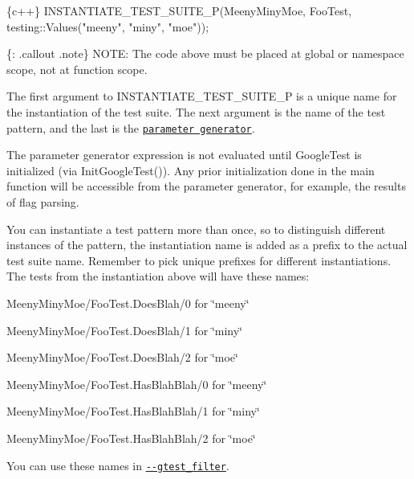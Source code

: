 \begin{DoxyCode}
\{c++\}
INSTANTIATE\_TEST\_SUITE\_P(MeenyMinyMoe,
                         FooTest,
                         testing::Values("meeny", "miny", "moe"));
\end{DoxyCode}


\{\+: .callout .note\} N\+O\+TE\+: The code above must be placed at global or namespace scope, not at function scope.

The first argument to {\ttfamily I\+N\+S\+T\+A\+N\+T\+I\+A\+T\+E\+\_\+\+T\+E\+S\+T\+\_\+\+S\+U\+I\+T\+E\+\_\+P} is a unique name for the instantiation of the test suite. The next argument is the name of the test pattern, and the last is the \href{reference/testing.md#param-generators}{\tt parameter generator}.

The parameter generator expression is not evaluated until Google\+Test is initialized (via {\ttfamily Init\+Google\+Test()}). Any prior initialization done in the {\ttfamily main} function will be accessible from the parameter generator, for example, the results of flag parsing.

You can instantiate a test pattern more than once, so to distinguish different instances of the pattern, the instantiation name is added as a prefix to the actual test suite name. Remember to pick unique prefixes for different instantiations. The tests from the instantiation above will have these names\+:


\begin{DoxyItemize}
\item {\ttfamily Meeny\+Miny\+Moe/\+Foo\+Test.\+Does\+Blah/0} for {\ttfamily \char`\"{}meeny\char`\"{}}
\item {\ttfamily Meeny\+Miny\+Moe/\+Foo\+Test.\+Does\+Blah/1} for {\ttfamily \char`\"{}miny\char`\"{}}
\item {\ttfamily Meeny\+Miny\+Moe/\+Foo\+Test.\+Does\+Blah/2} for {\ttfamily \char`\"{}moe\char`\"{}}
\item {\ttfamily Meeny\+Miny\+Moe/\+Foo\+Test.\+Has\+Blah\+Blah/0} for {\ttfamily \char`\"{}meeny\char`\"{}}
\item {\ttfamily Meeny\+Miny\+Moe/\+Foo\+Test.\+Has\+Blah\+Blah/1} for {\ttfamily \char`\"{}miny\char`\"{}}
\item {\ttfamily Meeny\+Miny\+Moe/\+Foo\+Test.\+Has\+Blah\+Blah/2} for {\ttfamily \char`\"{}moe\char`\"{}}
\end{DoxyItemize}

You can use these names in \href{#running-a-subset-of-the-tests}{\tt {\ttfamily -\/-\/gtest\+\_\+filter}}.

